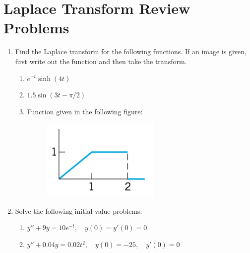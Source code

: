 \documentclass[letterpaper, fontsize=11pt]{scrartcl} %
\numberwithin{equation}{section} %
\numberwithin{figure}{section} %
\numberwithin{table}{section} %
\begin{document}

\newcommand{\horrule}[1]{\rule{\linewidth}{#1}} %


\section*{Laplace Transform Review Problems}

\begin{enumerate}
\item Find the Laplace transform for the following functions. If an image is given, first write out the function and then take the transform.

\begin{enumerate}

\item $e^{-t}\sinh (4t)$

\item $1.5\sin(3t-\pi/2)$

\item Function given in the following figure:
\begin{figure}[H]
\centering \includegraphics[width = 0.3\columnwidth]{LaplaceFig1.png}
\end{figure}
\end{enumerate}

\item Solve the following initial value problems:
\begin{enumerate}
\item $y'' + 9y = 10e^{-t},\quad y(0) = y'(0) = 0$

\item $y'' + 0.04y = 0.02t^2,\quad y(0) = -25,\quad y'(0) = 0$
\end{enumerate}


\end{enumerate}
\end{document}
